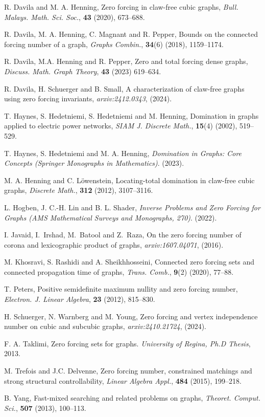 \documentclass[11pt]{article}
\theoremstyle{definition}
\newcommand{\1}{\vspace{0.1cm}}
\newcommand{\2}{\vspace{0.2cm}}
\newcommand{\3}{\vspace{0.3cm}}
\begin{document}
\begin{thebibliography}{99}
 R. Davila and M. A. Henning, Zero forcing in claw-free cubic graphs, \textit{Bull. Malays. Math. Sci. Soc.}, \textbf{43} (2020), 673--688.

 R. Davila, M. A. Henning, C. Magnant and R. Pepper, Bounds on the connected forcing number of a graph, \emph{Graphs Combin.}, \textbf{34}(6) (2018), 1159--1174.

 R. Davila, M.A. Henning and R. Pepper, Zero and total forcing dense graphs, \textit{Discuss. Math. Graph Theory}, \textbf{43} (2023) 619--634.

 R. Davila, H. Schuerger and B. Small, A characterization of claw-free graphs using zero forcing invariants, \emph{arxiv:2412.0343}, (2024).

T. Haynes,  S. Hedetniemi, S. Hedetniemi and  M. Henning,
Domination in graphs applied to electric power networks,
\emph{SIAM J. Discrete Math.}, \textbf{15}(4) (2002), 
519--529.

 T. Haynes, S. Hedetniemi and M. A. Henning, \emph{Domination in Graphs: Core Concepts (Springer Monographs in Mathematics)}. (2023).

 M. A. Henning and C. L\"{o}wenstein, Locating-total domination in claw-free cubic graphs, \textit{Discrete Math.}, \textbf{312} (2012), 3107--3116.

 L. Hogben, J. C.-H. Lin and B. L. Shader, \emph{Inverse Problems and Zero Forcing for Graphs (AMS Mathematical Surveys and Monographs, 270)}. (2022). 

 I. Javaid, I.~Irshad, M.~Batool and Z.~Raza, On the zero forcing number of corona and lexicographic product of graphs, \emph{arxiv:1607.04071}, (2016).

 M. Khosravi, S. Rashidi and A. Sheikhhosseini, Connected zero forcing sets and connected propagation time of graphs, \emph{Trans. Comb.}, \textbf{9}(2) (2020), 77--88.

 T. Peters, Positive semidefinite maximum nullity and zero forcing number, \textit{Electron. J. Linear Algebra}, \textbf{23} (2012), 815--830.

 H. Schuerger, N. Warnberg and M. Young, Zero forcing and vertex independence number on cubic and subcubic graphs, \emph{arxiv:2410.21724}, (2024).

 F. A. Taklimi, Zero forcing sets for graphs. \emph{University of Regina, Ph.D Thesis}, 2013. 

M. Trefois and J.C. Delvenne,
Zero forcing number, constrained matchings and strong structural controllability,
\emph{Linear Algebra Appl.},
\textbf{484} (2015), 199--218.

B. Yang,
Fast-mixed searching and related problems on graphs,
\emph{Theoret. Comput. Sci.}, \textbf{507} (2013), 100--113.

\end{thebibliography}
\end{document}
